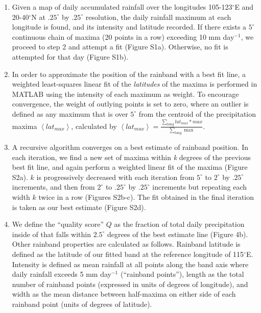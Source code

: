 \begin{enumerate}
	\item Given a map of daily accumulated rainfall over the longitudes 105-123$^{\circ}$E and 20-40$^{\circ}$N at $.25^{\circ}$ by $.25^{\circ}$ resolution, the daily rainfall maximum at each longitude is found, and its intensity and latitude recorded. If there exists a $5^{\circ}$ continuous chain of maxima (20 points in a row) exceeding 10 mm day$^{-1}$, we proceed to step 2 and attempt a fit (Figure S1a). Otherwise, no fit is attempted for that day (Figure S1b).
	
	\item In order to approximate the position of the rainband with a best fit line, a weighted least-squares linear fit of the \textit{latitudes} of the maxima is performed in MATLAB using the intensity of each maximum as weight. To encourage convergence, the weight of outlying points is set to zero, where an outlier is defined as any maximum that is over $5^{\circ}$ from the centroid of the precipitation maxima $\left<lat_{max}\right>$, calculated by $\left<lat_{max}\right>=\frac{\sum_{long} lat_{max}*max}{\sum_{long} \max}$.
	
	\item A recursive algorithm converges on a best estimate of rainband position. In each iteration, we find a new set of maxima within \textit{k} degrees of the previous best fit line, and again perform a weighted linear fit of the maxima (Figure S2a). $k$ is progressively decreased with each iteration from $5^{\circ}$ to $2^{\circ}$ by $.25^{\circ}$ increments, and then from $2^{\circ}$ to $.25^{\circ}$ by $.25^{\circ}$ increments but repeating each width $k$ twice in a row (Figures S2b-c). The fit obtained in the final iteration is taken as our best estimate (Figure S2d).
	
	\item We define the ``quality score'' $Q$ as the fraction of total daily precipitation inside of  that falls within $2.5^{\circ}$ degrees of the best estimate line (Figure 4b). Other rainband properties are calculated as follows. Rainband latitude is defined as the latitude of our fitted band at the reference longitude of 115$^{\circ}$E. Intensity is defined as mean rainfall at all points along the band axis where daily rainfall exceeds 5 mm day$^{-1}$ (``rainband points''), length as the total number of rainband points (expressed in units of degrees of longitude), and width as the mean distance between half-maxima on either side of each rainband point (units of degrees of latitude).
	

\end{enumerate}
